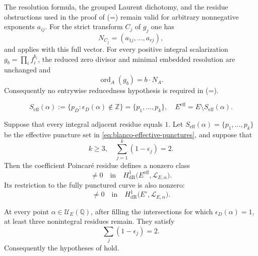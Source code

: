 \documentclass[10pt,a4paper]{amsart}
\DeclareMathOperator{\ord}{ord}
\newcommand{\Lcal}{\mathscr L}
\newcommand{\Q}{\mathbb Q}
\newcommand{\Z}{\mathbb Z}
\begin{document}
\begin{proposition}\label{prop:multiplicity-transport}
The resolution formula, the grouped Laurent dichotomy, and the residue obstructions used in the proof of  (=) remain valid for arbitrary nonnegative exponents $a_{ij}$. For the strict transform $C_j$ of $g_j$ one has
\begin{equation*}
N_{C_j}=(a_{1j},\ldots,a_{rj}),
\end{equation*}
and  applies with this full vector. For every positive integral scalarization $g_b=\prod_i f_i^{b_i}$, the reduced zero divisor and minimal embedded resolution are unchanged and
\begin{equation*}
\ord_A(g_b)=b\cdot N_A.
\end{equation*}
Consequently no entrywise reducedness hypothesis is required in  (=).
\end{proposition}

\begin{equation}\label{eq:blanco-effective-punctures}
S_{\mathrm{eff}}(\alpha):=\{p_D:\epsilon_D(\alpha)\notin\Z\}=\{p_1,\ldots,p_k\},\quad E^{\mathrm{eff}}=E\setminus S_{\mathrm{eff}}(\alpha).
\end{equation}

\begin{theorem}\label{thm:blanco-residue-class}
Suppose that every integral adjacent residue equals $1$. Let $S_{\mathrm{eff}}(\alpha)=\{p_1,\ldots,p_k\}$ be the effective puncture set in \eqref{eq:blanco-effective-punctures}, and suppose that
\begin{equation*}
k\geq3,
 \quad
 \sum_{j=1}^k(1-\epsilon_j)=2.
\end{equation*}
Then the coefficient Poincar\'e residue defines a nonzero class
\begin{equation*}
[R_{E,\alpha}]
 \neq0
 \quad\text{in}\quad
 H^1_{\mathrm{dR}}
 \bigl(E^{\mathrm{eff}},\Lcal_{E,\alpha}\bigr).
\end{equation*}
Its restriction to the fully punctured curve is also nonzero:
\begin{equation*}
[R_{E,\alpha}]
 \neq0
 \quad\text{in}\quad
 H^1_{\mathrm{dR}}
 \bigl(E^\circ,\Lcal_{E,\alpha}\bigr).
\end{equation*}
\end{theorem}

\begin{proposition}\label{prop:selected-numerical-exhaustion}
At every point $\alpha\in\mathcal U_E(\Q)$, after filling the intersections for which $\epsilon_D(\alpha)=1$, at least three nonintegral residues remain. They satisfy
\begin{equation*}
\sum_j(1-\epsilon_j)=2.
\end{equation*}
Consequently the hypotheses of  hold.
\end{proposition}
\end{document}
